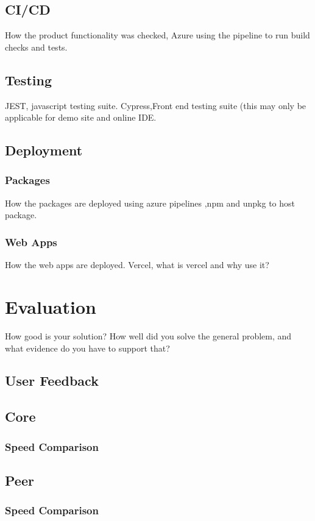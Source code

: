\documentclass{l4proj}
\begin{document}
\section{CI/CD}
\text How the product functionality was checked, Azure using the pipeline to run build checks and tests.

\section{Testing}
\text JEST, javascript testing suite. Cypress,Front end testing suite (this may only be applicable for demo site and online IDE.


\section{Deployment}
\subsection{Packages}
\text How the packages are deployed using azure pipelines ,npm and unpkg to host package.
\subsection{Web Apps}
\text How the web apps are deployed. Vercel, what is vercel and why use it?



\chapter{Evaluation} 
How good is your solution? How well did you solve the general problem, and what evidence do you have to support that?

\section{User Feedback}
\section{Core}
\subsection{Speed Comparison}
\section{Peer}
\subsection{Speed Comparison}
\end{document}
